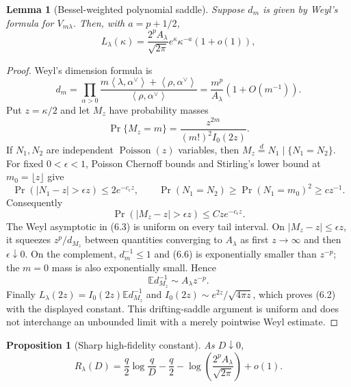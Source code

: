 \documentclass[11pt,a4paper]{article}
\newtheorem{proposition}[theorem]{Proposition}
\newtheorem{lemma}[theorem]{Lemma}
\newcommand{\E}{\mathbb E}
\newcommand{\ip}[2]{\left\langle #1,#2\right\rangle}
\begin{document}
\begin{lemma}[Bessel-weighted polynomial saddle]\label{lem:saddle}
Suppose $d_m$ is given by Weyl's formula for $V_{m\lambda}$.  Then, with
$a=p+1/2$,
\[
 L_\lambda(\kappa)=
 \frac{2^pA_\lambda}{\sqrt{2\pi}}
 e^\kappa\kappa^{-a}(1+o(1)),
 \tag{6.2}
\]
\end{lemma}

\begin{proof}
Weyl's dimension formula is
\[
 d_m=\prod_{\alpha>0}
 \frac{m\ip{\lambda}{\alpha^\vee}+\ip{\rho}{\alpha^\vee}}
      {\ip{\rho}{\alpha^\vee}}
 =\frac{m^p}{A_\lambda}(1+O(m^{-1})).
 \tag{6.3}
\]
Put $z=\kappa/2$ and let $M_z$ have probability masses
\[
 \Pr\{M_z=m\}=\frac{z^{2m}}{(m!)^2I_0(2z)}.
 \tag{6.4}
\]
If $N_1,N_2$ are independent $\operatorname{Poisson}(z)$ variables, then
$M_z\overset d=N_1\mid\{N_1=N_2\}$.  For fixed
$0<\epsilon<1$, Poisson Chernoff bounds and Stirling's lower bound at
$m_0=\lfloor z\rfloor$ give
\[
 \Pr(|N_1-z|>\epsilon z)\le2e^{-c_\epsilon z},
 \qquad
 \Pr(N_1=N_2)\ge\Pr(N_1=m_0)^2\ge c z^{-1}.
 \tag{6.5}
\]
Consequently
\[
 \Pr(|M_z-z|>\epsilon z)\le C z e^{-c_\epsilon z}.
 \tag{6.6}
\]
The Weyl asymptotic in (6.3) is uniform on every tail interval.
On $|M_z-z|\le\epsilon z$, it squeezes $z^p/d_{M_z}$ between quantities
converging to $A_\lambda$ as first $z\to\infty$ and then
$\epsilon\downarrow0$.  On the complement, $d_m^{-1}\le1$ and
(6.6) is exponentially smaller than $z^{-p}$; the $m=0$ mass is
also exponentially small.  Hence
\[
 \E d_{M_z}^{-1}\sim A_\lambda z^{-p}.
 \tag{6.7}
\]
Finally
$L_\lambda(2z)=I_0(2z)\E d_{M_z}^{-1}$ and
$I_0(2z)\sim e^{2z}/\sqrt{4\pi z}$, which proves (6.2) with the
displayed constant.  This drifting-saddle argument is uniform and does not
interchange an unbounded limit with a merely pointwise Weyl estimate.
\end{proof}

\begin{proposition}[Sharp high-fidelity constant]\label{prop:highfield}
As $D\downarrow0$,
\[
 \boxed{
 R_\lambda(D)=
 \frac q2\log\frac qD-\frac q2
 -\log\left(\frac{2^pA_\lambda}{\sqrt{2\pi}}\right)+o(1).}
 \tag{6.8}
\]
\end{proposition}
\end{document}
